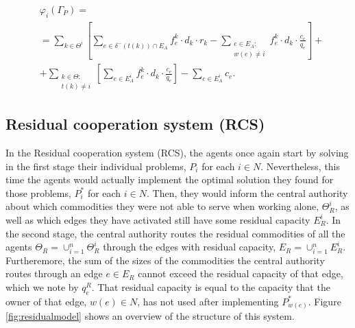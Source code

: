 \documentclass{article}
\begin{document}
\begin{equation}
    \begin{split}
    & \varphi_i(\Gamma_P) =\label{eq:PartialCooperationPayoff} \\
    & = \sum_{k\in \Theta^i} \left[ \sum_{e \in \delta^-(t(k))\cap E_A} f_e^k \cdot d_k \cdot r_k -  \sum_{\substack{e\in E_A \colon\\ w(e)\not = i}} f_e^k \cdot d_k \cdot \frac{c_e}{q_e} \right] + \\
    & + \sum_{\substack{k \in \Theta  \colon \\ t(k) \not = i}} \left[\sum_{e \in E_A^i} f_e^k \cdot d_k \cdot \frac{c_e}{q_e}\right] - \sum_{e \in E_A^i} c_e.
    \end{split}
\end{equation}

\subsection{Residual cooperation system (RCS)}

In the Residual cooperation system (RCS), the agents once again start by solving in the first stage their individual problems, $P_i$ for each $i\in N$. Nevertheless, this time the agents  would actually implement the optimal solution they found for those problems, $P_i^*$ for each $i\in N$. Then, they would inform the central authority about which commodities they were not able to serve when working alone, $\Theta_R^i$, as well as which edges they have activated still have some residual capacity $E_R^i$. In the second stage, the central authority routes the residual commodities of all the agents $\Theta_R = \cup_{i=1}^n \Theta_R^i$ through the edges with residual capacity, $E_R=\cup_{i=1}^n E_R^i$. Furtheremore, the sum of the sizes of the commodities the central authority routes through an edge $e\in E_R$ cannot exceed the residual capacity of that edge, which we note by $q_e^R$. That residual capacity is equal to the capacity that the owner of that edge, $w(e)\in N$, has not used after implementing $P_{w(e)}^*$.
Figure \ref{fig:residualmodel} shows an overview of the structure of this system.
\end{document}
